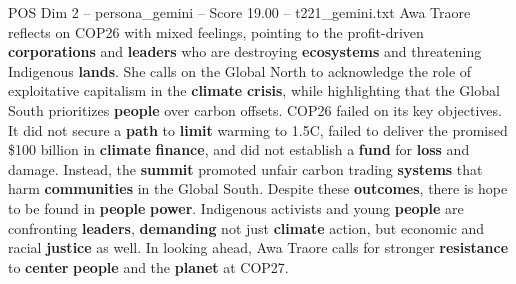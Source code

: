 \begin{textsample}{POS Dim 2 – persona\_gemini – Score 19.00 – t221\_gemini.txt}  \label{ex:f2_pos_048}
Awa Traore reflects on COP26 with mixed feelings, pointing to the profit-driven \textbf{corporations} and \textbf{leaders} who are destroying \textbf{ecosystems} and threatening Indigenous \textbf{lands}.
She calls on the Global North to acknowledge the role of exploitative capitalism in the \textbf{climate} \textbf{crisis}, while highlighting that the Global South prioritizes \textbf{people} over carbon offsets.
COP26 failed on its key objectives.
It did not secure a \textbf{path} to \textbf{limit} warming to 1.5C, failed to deliver the promised \$100 billion in \textbf{climate} \textbf{finance}, and did not establish a \textbf{fund} for \textbf{loss} and damage.
Instead, the \textbf{summit} promoted unfair carbon trading \textbf{systems} that harm \textbf{communities} in the Global South.
Despite these \textbf{outcomes}, there is hope to be found in \textbf{people} \textbf{power}.
Indigenous activists and young \textbf{people} are confronting \textbf{leaders}, \textbf{demanding} not just \textbf{climate} action, but economic and racial \textbf{justice} as well.
In looking ahead, Awa Traore calls for stronger \textbf{resistance} to \textbf{center} \textbf{people} and the \textbf{planet} at COP27.

\end{textsample}
